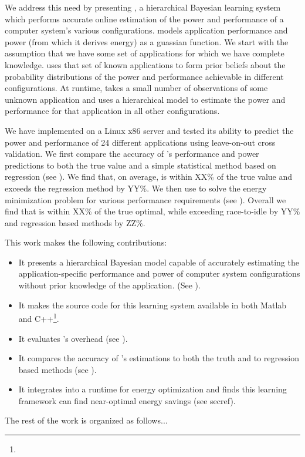 We address this need by presenting \SYSTEMLEO{}, a hierarchical Bayesian learning system which performs accurate online estimation of the power and performance of a computer system's various configurations.  \SYSTEMLEO{} models application performance and power (from which it derives energy) as a guassian function.  We start with the assumption that we have some set of applications for which we have complete knowledge.  \SYSTEMLEO{} uses that set of known applications to form prior beliefs about the probability distributions of the power and performance achievable in different configurations.  At runtime, \SYSTEMLEO{} takes a small number of observations of some unknown application and uses a hierarchical model to estimate the power and performance for that application in all other configurations.

We have implemented \SYSTEMLEO{} on a Linux x86 server and tested its ability to predict the power and performance of 24 different applications using leave-on-out cross validation.  We first compare the accuracy of \SYSTEMLEO{}'s performance and power predictions to both the true value and a simple statistical method based on regression (see \secref{}).  We find that, on average, \SYSTEMLEO{} is within XX\% of the true value and exceeds the regression method by YY\%.  We then use \SYSTEMLEO{} to solve the energy minimization problem for various performance requirements (see \secref{}).  Overall we find that \SYSTEMLEO{} is within XX\% of the true optimal, while exceeding race-to-idle by YY\% and regression based methods by ZZ\%.

This work makes the following contributions:
\begin{itemize}
\item It presents a hierarchical Bayesian model capable of accurately estimating the application-specific performance and power of computer system configurations without prior knowledge of the application. (See ).
\item It makes the source code for this learning system available in both Matlab and C++\footnote{}.
\item It evaluates \SYSTEMLEO{}'s overhead (see ).
\item It compares the accuracy of \SYSTEMLEO{}'s estimations to both the truth and to regression based methods (see \secref{}).
\item It integrates \SYSTEMLEO{} into a runtime for energy optimization and finds this learning framework can find near-optimal energy savings (see secref{}).
\end{itemize}

The rest of the work is organized as follows...
